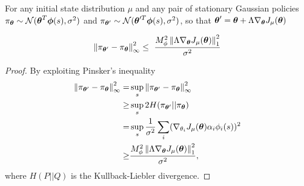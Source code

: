\begin{lemma}\label{aux:2}
For any initial state distribution $\mu$ and any pair of stationary Gaussian policies $\pi_{\vtheta} \sim \mathcal{N}(\vtheta^T\boldsymbol{\phi}(s),\sigma^2)$ and $\pi_{\vtheta'} \sim \mathcal{N}(\vtheta'^T\boldsymbol{\phi}(s),\sigma^2)$, so that $\vtheta'=\vtheta+\Lambda\gradJ{\vtheta}$

\[ \norm[\infty]{\pi_{\vtheta'}-\pi_{\vtheta}}^2 \leq \
	\frac{M_{\phi}^2\norm[1]{\Lambda\gradJ{\vtheta}}^2}{\sigma^2}
\]
\end{lemma}

\begin{proof}
By exploiting Pinsker's inequality \cite{Pinsker1960}
\begin{align*}
\norm[\infty]{\pi_{\vtheta'}-\pi_{\vtheta}}^2 = & \sup\limits_s \norm[\infty]{\pi_{\vtheta'}-\pi_{\vtheta}}^2 \\
	\geq & \sup\limits_s 2H(\pi_{\vtheta'}||\pi_{\vtheta}) \\
	= & \sup\limits_s \frac{1}{\sigma^2} \sum\limits_i 
	(\gradJ{\theta_i}\alpha_i\phi_i(s))^2 \\
	\geq & \frac{M_{\phi}^2\norm[1]{\Lambda\gradJ{\vtheta}}^2}{\sigma^2},
\end{align*}
where $H(P||Q)$ is the Kullback-Liebler divergence.
\end{proof}


